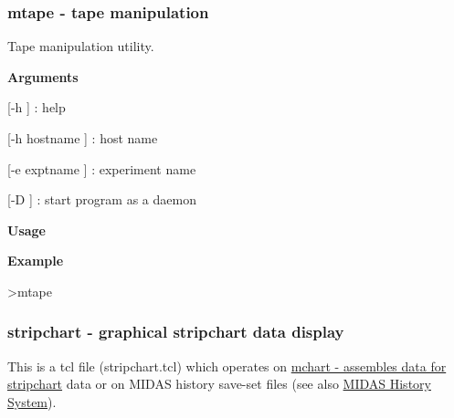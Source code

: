 \label{F_LogUtil_idx_mtape_utility}
\hypertarget{F_LogUtil_idx_mtape_utility}{}
 

 \hypertarget{F_LogUtil_F_mtape_utility}{}\subsubsection{mtape  -\/ tape manipulation}\label{F_LogUtil_F_mtape_utility}
Tape manipulation utility.


\begin{DoxyItemize}
\item {\bfseries  Arguments }
\begin{DoxyItemize}
\item \mbox{[}-\/h \mbox{]} : help
\item \mbox{[}-\/h hostname \mbox{]} : host name
\item \mbox{[}-\/e exptname \mbox{]} : experiment name
\item \mbox{[}-\/D \mbox{]} : start program as a daemon
\end{DoxyItemize}
\end{DoxyItemize}


\begin{DoxyItemize}
\item {\bfseries  Usage }
\item {\bfseries  Example } 
\begin{DoxyCode}
 >mtape
\end{DoxyCode}

\end{DoxyItemize}



 \hypertarget{F_LogUtil_F_stripchartfile}{}\subsubsection{stripchart   -\/ graphical stripchart data display}\label{F_LogUtil_F_stripchartfile}
This is a tcl file (stripchart.tcl) which operates on \hyperlink{F_LogUtil_F_mchart_utility}{mchart -\/ assembles data for stripchart} data or on MIDAS history save-\/set files (see also \hyperlink{F_History_logging_F_History_System}{MIDAS History System}).


